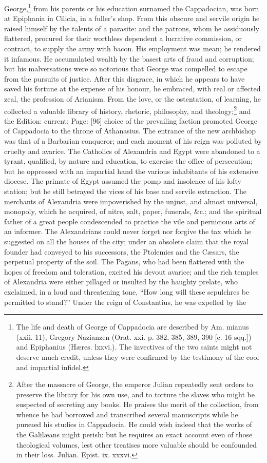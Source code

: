George,\footnote{The life and death of George of Cappadocia are described by Am. mianus (xxii. 11), Gregory Nazianzen (Orat. xxi. p. 382, 385, 389, 390 [c. 16 sqq.]) and Epiphanius (Hæres. lxxvi.). The invectives of the two saints might not deserve much credit, unless they were confirmed by the testimony of the cool and impartial infidel.} from his parents or his education surnamed the Cappadocian, was born at Epiphania in Cilicia, in a fuller\texthebrew{}’s shop. From this obscure and servile origin he raised himself by the talents of a parasite: and the patrons, whom he assiduously flattered, procured for their worthless dependent a lucrative commission, or contract, to supply the army with bacon. His employment was mean; he rendered it infamous. He accumulated wealth by the basest arts of fraud and corruption; but his malversations were so notorious that George was compelled to escape from the pursuits of justice. After this disgrace, in which he appears to have saved his fortune at the expense of his honour, he embraced, with real or affected zeal, the profession of Arianism. From the love, or the ostentation, of learning, he collected a valuable library of history, rhetoric, philosophy, and theology;\footnote{After the massacre of George, the emperor Julian repeatedly sent orders to preserve the library for his own use, and to torture the slaves who might be suspected of secreting any books. He praises the merit of the collection, from whence he had borrowed and transcribed several manuscripts while he pursued his studies in Cappadocia. He could wish indeed that the works of the Galilæans might perish: but he requires an exact account even of those theological volumes, lest other treatises more valuable should be confounded in their loss. Julian. Epist. ix. xxxvi.} and the Edition: current; Page: [96] choice of the prevailing faction promoted George of Cappadocia to the throne of Athanasius. The entrance of the new archbishop was that of a Barbarian conqueror; and each moment of his reign was polluted by cruelty and avarice. The Catholics of Alexandria and Egypt were abandoned to a tyrant, qualified, by nature and education, to exercise the office of persecution; but he oppressed with an impartial hand the various inhabitants of his extensive diocese. The primate of Egypt assumed the pomp and insolence of his lofty station; but he still betrayed the vices of his base and servile extraction. The merchants of Alexandria were impoverished by the unjust, and almost universal, monopoly, which he acquired, of nitre, salt, paper, funerals, \&c.; and the spiritual father of a great people condescended to practice the vile and pernicious arts of an informer. The Alexandrians could never forget nor forgive the tax which he suggested on all the houses of the city; under an obsolete claim that the royal founder had conveyed to his successors, the Ptolemies and the Cæsars, the perpetual property of the soil. The Pagans, who had been flattered with the hopes of freedom and toleration, excited his devout avarice; and the rich temples of Alexandria were either pillaged or insulted by the haughty prelate, who exclaimed, in a loud and threatening tone, \texthebrew{“}How long will these sepulchres be permitted to stand?\texthebrew{}” Under the reign of Constantius, he was expelled by the 